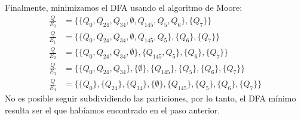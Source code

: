 \documentclass[spanish]{article}
\begin{document}
Finalmente, minimizamos el DFA usando el algoritmo de Moore: 
\begin{align*}
  \frac{Q}{E_0} &= \{\{Q_0, Q_{24}, Q_{34}, \emptyset, Q_{145}, Q_5, Q_6\}, \{Q_7\}\}\\
  \frac{Q}{E_1} &= \{\{Q_0, Q_{24}, Q_{34}, \emptyset, Q_{145}, Q_5\}, \{Q_6\}, \{Q_7\}\}\\
  \frac{Q}{E_2} &= \{\{Q_0, Q_{24}, Q_{34}, \emptyset\}, \{Q_{145}, Q_5\}, \{Q_6\}, \{Q_7\}\}\\
  \frac{Q}{E_3} &= \{\{Q_0, Q_{24}, Q_{34}\}, \{\emptyset\}, \{Q_{145}\} , \{Q_5\}, \{Q_6\}, \{Q_7\}\}\\
  \frac{Q}{E_4} &= \{\{Q_0\}, \{Q_{24}\}, \{Q_{34}\}, \{\emptyset\}, \{Q_{145}\} , \{Q_5\}, \{Q_6\}, \{Q_7\}\}
\end{align*}
No es posible seguir subdividiendo las particiones, por lo tanto, el DFA mínimo
resulta ser el que habíamos encontrado en el paso anterior.
\end{document}

